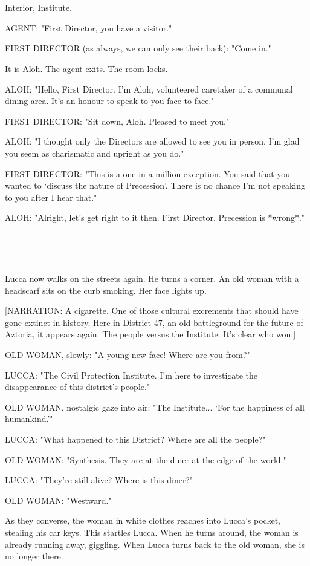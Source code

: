 \documentclass[11pt]{article}
\begin{document}
\ 

\ 

Interior, Institute.

AGENT: "First Director, you have a visitor."

FIRST DIRECTOR (as always, we can only see their back): "Come in."

It is Aloh.
The agent exits. The room locks.

ALOH: "Hello, First Director. 
I'm Aloh, volunteered caretaker of a communal dining area.
It's an honour to speak to you face to face."

FIRST DIRECTOR: "Sit down, Aloh. 
Pleased to meet you."

ALOH: "I thought only the Directors are allowed to see you in person.
I'm glad you seem as charismatic and upright as you do."

FIRST DIRECTOR: "This is a one-in-a-million exception.
You said that you wanted to `discuss the nature of Precession'. 
There is no chance I'm not speaking to you after I hear that."

ALOH: "Alright, let's get right to it then. 
First Director. 
Precession is *wrong*."

\ 

\ 

Lucca now walks on the streets again.
He turns a corner.
An old woman with a headscarf sits on the curb smoking.
Her face lights up.

[NARRATION: A cigarette. 
One of those cultural excrements that should have gone extinct in history.
Here in District 47, an old battleground for the future of Aztoria, it appears again.
The people versus the Institute. 
It's clear who won.]

OLD WOMAN, slowly: "A young new face! Where are you from?"

LUCCA: "The Civil Protection Institute. I'm here to investigate the disappearance of this district's people."

OLD WOMAN, nostalgic gaze into air: "The Institute...
`For the happiness of all humankind.'"

LUCCA: "What happened to this District?
Where are all the people?"

OLD WOMAN: "Synthesis.
They are at the diner at the edge of the world."

LUCCA: "They're still alive? Where is this diner?"

OLD WOMAN: "Westward."

As they converse, the woman in white clothes reaches into Lucca's pocket, stealing his car keys. 
This startles Lucca.
When he turns around, the woman is already running away, giggling.
When Lucca turns back to the old woman, she is no longer there.
\end{document}

